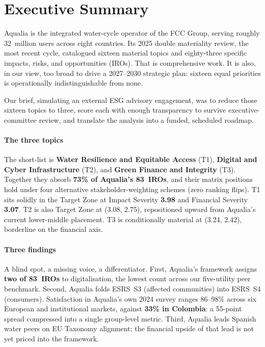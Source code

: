 \documentclass[11pt, a4paper]{article}
\newcommand{\sig}[1]{\textbf{#1}}
\begin{document}
\clearpage
\pagestyle{fancy}
\setcounter{page}{1}

\section{Executive Summary}
\label{sec:execsum}

Aqualia is the integrated water-cycle operator of the FCC Group, serving roughly 32~million users across eight countries. Its 2025 double materiality review, the most recent cycle, catalogued sixteen material topics and eighty-three specific impacts, risks, and opportunities (IROs). That is comprehensive work. It is also, in our view, too broad to drive a 2027--2030 strategic plan: sixteen equal priorities is operationally indistinguishable from none.

Our brief, simulating an external ESG advisory engagement, was to reduce those sixteen topics to three, score each with enough transparency to survive executive-committee review, and translate the analysis into a funded, scheduled roadmap.

\paragraph{The three topics}
The short-list is \sig{Water Resilience and Equitable Access} (T1), \sig{Digital and Cyber Infrastructure} (T2), and \sig{Green Finance and Integrity} (T3). Together they absorb \sig{73\% of Aqualia's 83~IROs}, and their matrix positions hold under four alternative stakeholder-weighting schemes (zero ranking flips). T1 sits solidly in the Target Zone at Impact Severity \sig{3.98} and Financial Severity \sig{3.07}. T2 is also Target Zone at (3.08, 2.75), repositioned upward from Aqualia's current lower-middle placement. T3 is conditionally material at (3.24, 2.42), borderline on the financial axis.

\paragraph{Three findings}
A blind spot, a missing voice, a differentiator. First, Aqualia's framework assigns \sig{two of 83~IROs} to digitalisation, the lowest count across our five-utility peer benchmark. Second, Aqualia folds ESRS~S3 (affected communities) into ESRS~S4 (consumers). Satisfaction in Aqualia's own 2024 survey ranges 86--98\% across six European and institutional markets, against \sig{33\% in Colombia}: a 55-point spread compressed into a single group-level metric. Third, Aqualia leads Spanish water peers on EU Taxonomy alignment; the financial upside of that lead is not yet priced into the framework.
\end{document}
